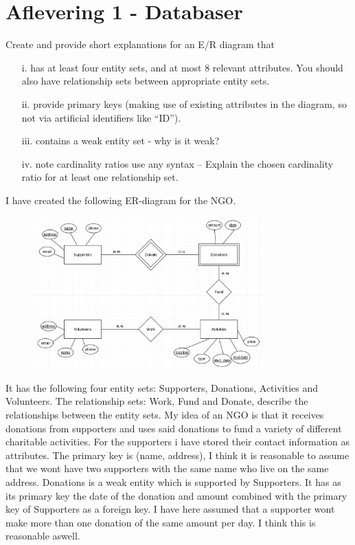 \documentclass[working, oneside]{../../../Preambles/tuftebook}
\begin{document}
\let\cleardoublepage\clearpage
\thispagestyle{fancy}
\chapter{Aflevering 1 - Databaser}
\begin{exercise}[1]
Create and provide short explanations for an E/R diagram that
\begin{itemize}
    \item[i.] has at least four entity sets, and at most 8 relevant attributes. You should also have
relationship sets between appropriate entity sets. 
\item[ii.] provide primary keys (making use of existing attributes in the diagram, so not via artificial
identifiers like “ID”).
\item[iii.] contains a weak entity set - why is it weak?
\item[iv.] note cardinality ratios use any syntax – Explain the chosen cardinality ratio for at least one relationship set.
\end{itemize}
\end{exercise}
I have created the following ER-diagram for the NGO.
\begin{figure}[htpb]
    \centering
    \includegraphics[width=0.8\textwidth]{../afl_1/Screenshot from 2025-02-13 11-54-44.png}
\end{figure}
It has the following four entity sets: Supporters, Donations, Activities and Volunteers. The relationship sets: Work, Fund and Donate, describe the relationships between the entity sets. My idea of an NGO is that it receives donations from supporters and uses said donations to fund a variety of different charitable activities. For the supporters i have stored their contact information as attributes. The primary key is (name, address), I think it is reasonable to assume that we wont have two supporters with the same name who live on the same address. Donations is a weak entity which is supported by Supporters. It has as its primary key the date of the donation and amount combined with the primary key of Supporters as a foreign key. I have here assumed that a supporter wont make more than one donation of the same amount per day. I think this is reasonable aswell.
\end{document}
